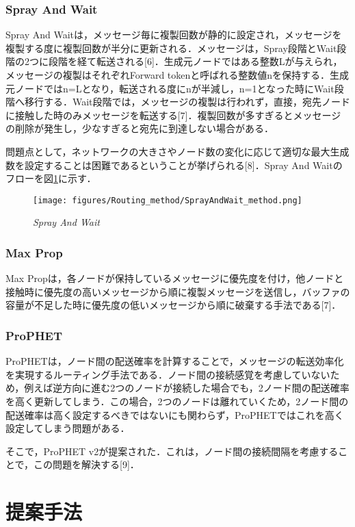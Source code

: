 \documentclass[11pt]{icsthesis}
\begin{document}
\subsection{Spray And Wait}
Spray And Waitは，メッセージ毎に複製回数が静的に設定され，メッセージを複製する度に複製回数が半分に更新される．メッセージは，Spray段階とWait段階の2つに段階を経て転送される[6]．生成元ノードではある整数Lが与えられ，メッセージの複製はそれぞれForward tokenと呼ばれる整数値nを保持する．生成元ノードではn=Lとなり，転送される度にnが半減し，n=1となった時にWait段階へ移行する．Wait段階では，メッセージの複製は行われず，直接，宛先ノードに接触した時のみメッセージを転送する[7]．複製回数が多すぎるとメッセージの削除が発生し，少なすぎると宛先に到達しない場合がある．

問題点として，ネットワークの大きさやノード数の変化に応じて適切な最大生成数を設定することは困難であるということが挙げられる[8]．Spray And Waitのフローを図\ref{SprayAndWait}に示す．

\begin{figure}[h]
	\centering
	\texttt{[image: figures/Routing\_method/SprayAndWait\_method.png]}
	\caption[]{\it{Spray And Wait}}
	\label{SprayAndWait}
\end{figure}

\subsection{Max Prop}
Max Propは，各ノードが保持しているメッセージに優先度を付け，他ノードと接触時に優先度の高いメッセージから順に複製メッセージを送信し，バッファの容量が不足した時に優先度の低いメッセージから順に破棄する手法である[7]．

\subsection{ProPHET}
ProPHETは，ノード間の配送確率を計算することで，メッセージの転送効率化を実現するルーティング手法である．ノード間の接続感覚を考慮していないため，例えば逆方向に進む2つのノードが接続した場合でも，2ノード間の配送確率を高く更新してしまう．この場合，2つのノードは離れていくため，2ノード間の配送確率は高く設定するべきではないにも関わらず，ProPHETではこれを高く設定してしまう問題がある．

そこで，ProPHET v2が提案された．これは，ノード間の接続間隔を考慮することで，この問題を解決する[9]．

\chapter{提案手法}
\end{document}
